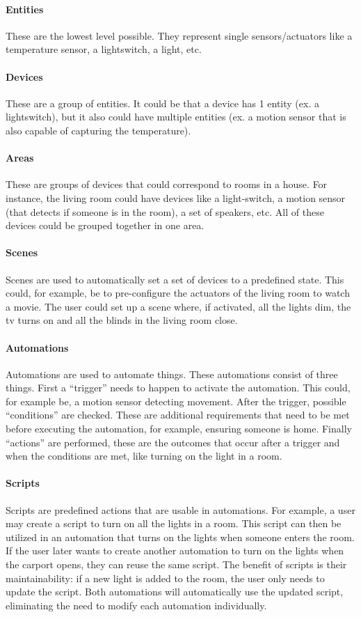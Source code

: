 \documentclass[11pt,a4paper]{report}
\begin{document}
\paragraph{Entities}
These are the lowest level possible. They represent single sensors/actuators like a temperature sensor, a lightswitch, a light, etc.
\paragraph{Devices}
These are a group of entities. It could be that a device has 1 entity (ex. a lightswitch), but it also could have multiple entities (ex. a motion sensor that is also capable of capturing the temperature).
\paragraph{Areas}
These are groups of devices that could correspond to rooms in a house. For instance, the living room could have devices like a light-switch, a motion sensor (that detects if someone is in the room), a set of speakers, etc. All of these devices could be grouped together in one area.
\paragraph{Scenes}
Scenes are used to automatically set a set of devices to a predefined state. This could, for example, be to pre-configure the actuators of the living room to watch a movie. The user could set up a scene where, if activated, all the lights dim, the tv turns on and all the blinds in the living room close. 
\paragraph{Automations}
Automations are used to automate things. These automations consist of three things.
First a ``trigger'' needs to happen to activate the automation. This could, for example be, a motion sensor detecting movement. After the trigger, possible ``conditions'' are checked. These are additional requirements that need to be met before executing the automation, for example, ensuring someone is home. Finally ``actions'' are performed, these are the outcomes that occur after a trigger and when the conditions are met, like turning on the light in a room.
\paragraph{Scripts}
Scripts are predefined actions that are usable in automations. For example, a user may create a script to turn on all the lights in a room. This script can then be utilized in an automation that turns on the lights when someone enters the room. If the user later wants to create another automation to turn on the lights when the carport opens, they can reuse the same script. The benefit of scripts is their maintainability: if a new light is added to the room, the user only needs to update the script. Both automations will automatically use the updated script, eliminating the need to modify each automation individually.
\end{document}
